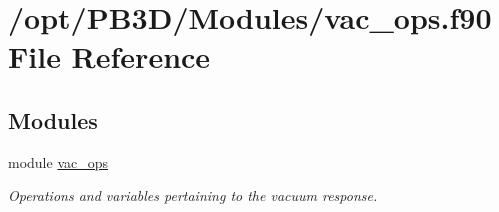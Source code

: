 \hypertarget{vac__ops_8f90}{}\section{/opt/\+P\+B3\+D/\+Modules/vac\+\_\+ops.f90 File Reference}
\label{vac__ops_8f90}
\subsection*{Modules}
\begin{DoxyCompactItemize}
\item 
module \hyperlink{namespacevac__ops}{vac\+\_\+ops}
\begin{DoxyCompactList}\small\item\em Operations and variables pertaining to the vacuum response. \end{DoxyCompactList}\end{DoxyCompactItemize}
